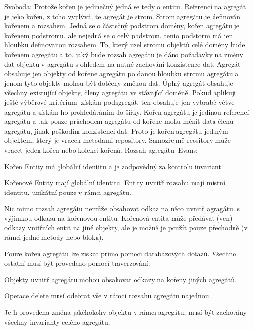 Svoboda\+: Protože kořen je jedinečný jedná se tedy o entitu. Referencí na agregát je jeho kořen, z toho vyplývá, že agregát je strom. Strom agregátu je definován kořenem a rozsahem. Jedná se o částečný podstrom domény, kořen agregátu je kořenem podstromu, ale nejedná se o celý podstrom, tento podstorm má jen hloubku definovanou rozsahem. To, který uzel stromu objektů celé domény bude kořenem agregátu a to, jaký bude rozsah agregátu je dáno požadavky na změny dat objektů v agregátu s ohledem na nutné zachování konzistence dat. Agregát obsahuje jen objekty od kořene agregátu po danou hloubku stromu agregátu a jenom tyto objekty mohou být dotčeny změnou dat. Úplný agregát obsahuje všechny existující objekty, členy agregátu ve stávající doméně. Pokud aplikuji ještě výběrové kritérium, získám podagregát, ten obsahuje jen vybrabé větve agregátu a získám ho prohledáváním do šířky. Kořen agregátu je jedinou referencí agregátu a tak pouze průchodem agregátu od kořene mohu měnit data členů agregátu, jinak poškodím konzistenci dat. Proto je kořen agregátu jediným objektem, který je vracen metodami repository. Samozřejmě reository může vracet jeden kořen nebo kolekci kořenů. Rozsah agregátu\+: Evans\+:
\begin{DoxyItemize}
\item Kořen \mbox{\hyperlink{namespace_pes_1_1_entity}{Entity}} má globální identitu a je zodpovědný za kontrolu invariant
\item Kořenové \mbox{\hyperlink{namespace_pes_1_1_entity}{Entity}} mají globální identitu. \mbox{\hyperlink{namespace_pes_1_1_entity}{Entity}} uvnitř rozsahu mají místní identitu, unikátní pouze v rámci agregátu.
\item Nic mimo rozsah agregátu nemůže obsahovat odkaz na něco uvnitř agragátu, s výjimkou odkazu na kořenovou entitu. Kořenová entita může předávat (ven) odkazy vnitřních entit na jiné objekty, ale je možné je použít pouze přechodně (v rámci jedné metody nebo bloku).
\item Pouze kořen agregátu lze získat přímo pomocí databázových dotazů. Všechno ostatní musí být provedeno pomocí traverzování.
\item Objekty uvnitř agregátu mohou obsahovat odkazy na kořeny jiných agregátů.
\item Operace delete musí odebrat vše v rámci rozsahu agregátu najednou.
\item Je-\/li provedena změna jakéhokoliv objektu v rámci agregátu, musí být zachovány všechny invarianty celého agregátu.
\end{DoxyItemize}

